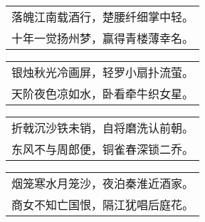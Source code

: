 \nopagebreak%
\nopagebreak%
\noindent\begin{minipage}{\linewidth}
  \vskip-3pt\begin{table}[H]
    \centering
    \begin{tabular}{@{}l@{}}
落魄江南载酒行，楚腰纤细掌中轻。\\
十年一觉扬州梦，赢得青楼薄幸名。
    \end{tabular}
  \end{table}
\end{minipage}
\vspace{1cm}


\nopagebreak%
\nopagebreak%
\noindent\begin{minipage}{\linewidth}
  \vskip-3pt\begin{table}[H]
    \centering
    \begin{tabular}{@{}l@{}}
银烛秋光冷画屏，轻罗小扇扑流萤。\\
天阶夜色凉如水，卧看牵牛织女星。
    \end{tabular}
  \end{table}
\end{minipage}
\vspace{1cm}


\nopagebreak%
\nopagebreak%
\noindent\begin{minipage}{\linewidth}
  \vskip-3pt\begin{table}[H]
    \centering
    \begin{tabular}{@{}l@{}}
折戟沉沙铁未销，自将磨洗认前朝。\\
东风不与周郎便，铜雀春深锁二乔。
    \end{tabular}
  \end{table}
\end{minipage}
\vspace{1cm}


\nopagebreak%
\nopagebreak%
\noindent\begin{minipage}{\linewidth}
  \vskip-3pt\begin{table}[H]
    \centering
    \begin{tabular}{@{}l@{}}
烟笼寒水月笼沙，夜泊秦淮近酒家。\\
商女不知亡国恨，隔江犹唱后庭花。
    \end{tabular}
  \end{table}
\end{minipage}
\vspace{1cm}


